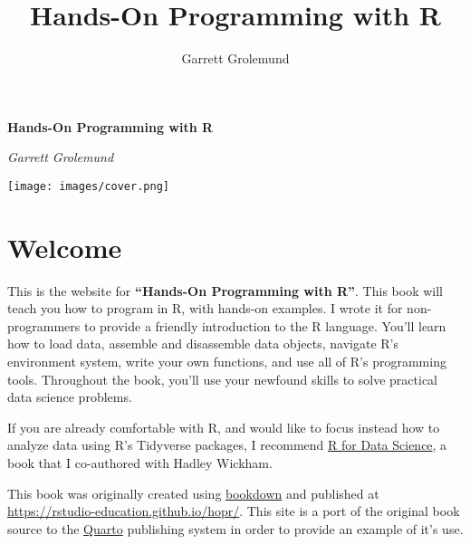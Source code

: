 \documentclass[
  letterpaper,
  DIV=11,
  numbers=noendperiod]{scrbook}
\title{Hands-On Programming with R}
\author{Garrett Grolemund}
\date{}
\renewcommand*\contentsname{Table of contents}
\newcommand\contentsname{Table of contents}
\begin{document}
\frontmatter
\maketitle

\frontmatter
\begin{titlepage}
\thispagestyle{empty}
\begin{center}
\vspace*{2cm}
{\Huge\bfseries Hands-On Programming with R\par}
\vspace{2cm}
{\Large\itshape Garrett Grolemund\par}
\vfill
\texttt{[image: images/cover.png]}
\vfill
\end{center}
\end{titlepage}
\cleardoublepage
\mainmatter

\renewcommand*\contentsname{Table of contents}
{
\hypersetup{linkcolor=}
\setcounter{tocdepth}{2}
\tableofcontents
}

\mainmatter
{}

\chapter*{Welcome}\label{welcome}


This is the website for \textbf{``Hands-On Programming with R''}. This
book will teach you how to program in R, with hands-on examples. I wrote
it for non-programmers to provide a friendly introduction to the R
language. You'll learn how to load data, assemble and disassemble data
objects, navigate R's environment system, write your own functions, and
use all of R's programming tools. Throughout the book, you'll use your
newfound skills to solve practical data science problems.

If you are already comfortable with R, and would like to focus instead
how to analyze data using R's Tidyverse packages, I recommend
\href{http://r4ds.had.co.nz/}{R for Data Science}, a book that I
co-authored with Hadley Wickham.

\begin{tcolorbox}[enhanced jigsaw, left=2mm, breakable, colback=white, colframe=quarto-callout-note-color-frame, leftrule=.75mm, bottomrule=.15mm, arc=.35mm, opacityback=0, rightrule=.15mm, toprule=.15mm]
\begin{minipage}[t]{5.5mm}
\textcolor{quarto-callout-note-color}{\faInfo}
\end{minipage}%
\begin{minipage}[t]{\textwidth - 5.5mm}

This book was originally created using
\href{https://bookdown.org}{bookdown} and published at
\url{https://rstudio-education.github.io/hopr/}. This site is a port of
the original book source to the \href{https://quarto.org}{Quarto}
publishing system in order to provide an example of it's use.

\end{minipage}%
\end{tcolorbox}
\end{document}
